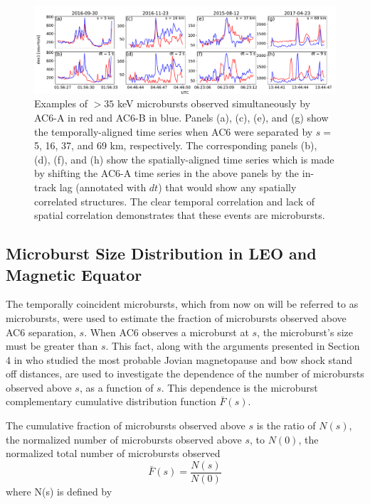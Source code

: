 \documentclass[draft]{agujournal2019}
\begin{document}
\begin{figure}
\includegraphics[width=\textwidth]{fig2.pdf}
\caption{Examples of $>35$ keV microbursts observed simultaneously by AC6-A in red and AC6-B in blue. Panels (a), (c), (e), and (g) show the temporally-aligned time series when AC6 were separated by $s=$ 5, 16, 37, and 69 km, respectively. The corresponding panels (b), (d), (f), and (h) show the spatially-aligned time series which is made by shifting the AC6-A time series in the above panels by the in-track lag (annotated with $dt$) that would show any spatially correlated structures. The clear temporal correlation and lack of spatial correlation demonstrates that these events are microbursts.} 
\label{fig2}
\end{figure}
	

\subsection{Microburst Size Distribution in LEO and Magnetic Equator}\label{microburst_distribution}
The temporally coincident microbursts, which from now on will be referred to as microbursts, were used to estimate the fraction of microbursts observed above AC6 separation, $s$. When AC6 observes a microburst at $s$, the microburst's size must be greater than $s$. This fact, along with the arguments presented in Section 4 in  who studied the most probable Jovian magnetopause and bow shock stand off distances, are used to investigate the dependence of the number of microbursts observed above $s$, as a function of $s$. This dependence is the microburst complementary cumulative distribution function $\bar{F}(s)$. 

The cumulative fraction of microbursts observed above $s$ is the ratio of $N(s)$, the normalized number of microbursts observed above $s$, to $N(0)$, the normalized total number of microbursts observed 
\begin{equation} \label{Fs}
\bar{F}(s) = \frac{N(s)}{N(0)}
\end{equation} where N(s) is defined by
\end{document}
